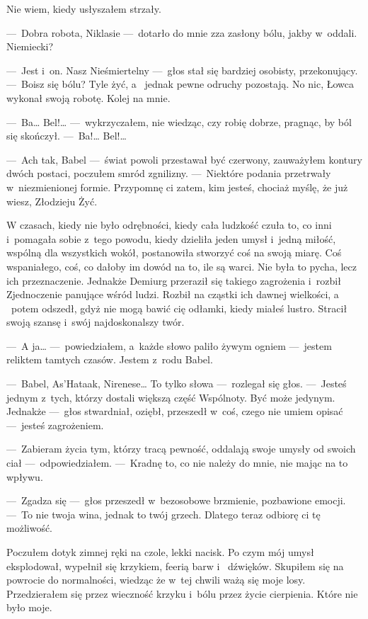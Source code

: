 Nie wiem, kiedy usłyszałem strzały.

---~Dobra robota, Niklasie ---~dotarło do mnie zza zasłony bólu, jakby w~oddali. Niemiecki? 

---~Jest i~on. Nasz Nieśmiertelny ---~głos stał się bardziej osobisty, przekonujący. ---~Boisz się bólu? Tyle żyć, a~
jednak pewne odruchy pozostają. No nic, Łowca wykonał swoją robotę. Kolej na mnie.

---~Ba… Bel!… ---~wykrzyczałem, nie wiedząc, czy robię dobrze, pragnąc, by ból się skończył. ---~Ba!… Bel!…

---~Ach tak, Babel ---~świat powoli przestawał być czerwony, zauważyłem kontury dwóch postaci, poczułem smród 
zgnilizny. ---~Niektóre podania przetrwały w~niezmienionej formie. Przypomnę ci zatem, kim jesteś, chociaż myślę, że 
już wiesz, Złodzieju Żyć.

W czasach, kiedy nie było odrębności, kiedy cała ludzkość czuła to, co inni i~pomagała sobie z~tego powodu, kiedy 
dzieliła jeden umysł i~jedną miłość, wspólną dla wszystkich wokół, postanowiła stworzyć coś na swoją miarę. Coś 
wspaniałego, coś, co dałoby im dowód na to, ile są warci. Nie była to pycha, lecz ich przeznaczenie. Jednakże Demiurg 
przeraził się takiego zagrożenia i~rozbił Zjednoczenie panujące wśród ludzi. Rozbił na cząstki ich dawnej wielkości, a
~potem odszedł, gdyż nie mogą bawić cię odłamki, kiedy miałeś lustro. Stracił swoją szansę i~swój najdoskonalszy twór.

---~A ja… ---~powiedziałem, a~każde słowo paliło żywym ogniem ---~jestem reliktem tamtych czasów. Jestem z~rodu Babel.

---~Babel, As’Hataak, Nirenese… To tylko słowa ---~rozlegał się głos. ---~Jesteś jednym z~tych, którzy dostali 
większą część Wspólnoty. Być może jedynym. Jednakże ---~głos stwardniał, oziębł, przeszedł w~coś, czego nie umiem 
opisać ---~jesteś zagrożeniem.

---~Zabieram życia tym, którzy tracą pewność, oddalają swoje umysły od swoich ciał ---~odpowiedziałem. ---~Kradnę to, 
co nie należy do mnie, nie mając na to wpływu.

---~Zgadza się ---~głos przeszedł w~bezosobowe brzmienie, pozbawione emocji. ---~To nie twoja wina, jednak to twój 
grzech. Dlatego teraz odbiorę ci tę możliwość.

Poczułem dotyk zimnej ręki na czole, lekki nacisk. Po czym mój umysł eksplodował, wypełnił się krzykiem, feerią barw i
~dźwięków. Skupiłem się na powrocie do normalności, wiedząc że w~tej chwili ważą się moje losy. Przedzierałem się 
przez wieczność krzyku i~bólu przez życie cierpienia. Które nie było moje.

